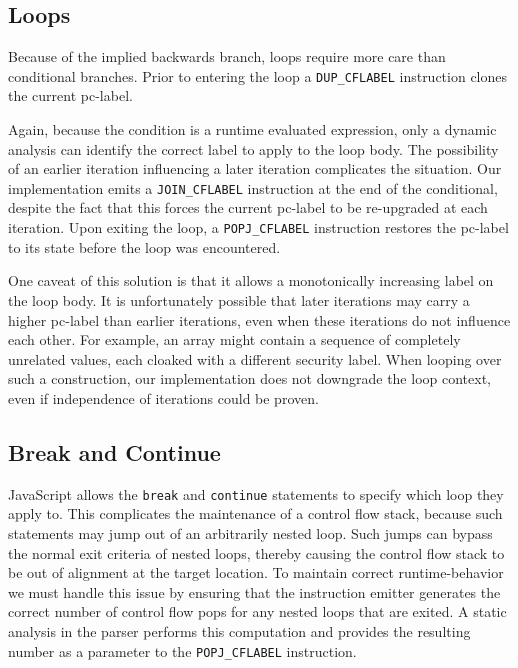 \subsection{Loops}

Because of the implied backwards branch, loops require more care than conditional branches.
Prior to entering the loop a \texttt{DUP\_CFLABEL} instruction clones the current pc-label.

Again, because the condition is a runtime evaluated expression, only a dynamic analysis can identify the correct label to apply to the loop body.
The possibility of an earlier iteration influencing a later iteration complicates the situation.
Our implementation emits a \texttt{JOIN\_CFLABEL} instruction at the end of the conditional, despite the fact that this forces the current pc-label to be re-upgraded at each iteration.
Upon exiting the loop, a \texttt{POPJ\_CFLABEL} instruction restores the pc-label to its state before the loop was encountered.

One caveat of this solution is that it allows a monotonically increasing label on the loop body.
It is unfortunately possible that later iterations may carry a higher pc-label than earlier iterations, even when these iterations do not influence each other.
For example, an array might contain a sequence of completely unrelated values, each cloaked with a different security label.
When looping over such a construction, our implementation does not downgrade the loop context, even if independence of iterations could be proven.

\subsection{Break and Continue}
\label{sec:break-and-continue}
JavaScript allows the \texttt{break} and \texttt{continue} statements to specify which loop they apply to.
This complicates the maintenance of a control flow stack, because such statements may jump out of an arbitrarily nested loop.
Such jumps can bypass the normal exit criteria of nested loops, thereby causing the control flow stack to be out of alignment at the target location.
To maintain correct runtime-behavior we must handle this issue by ensuring that the instruction emitter generates the correct number of control flow pops for any nested loops that are exited.
A static analysis in the parser performs this computation and provides the resulting number as a parameter to the \texttt{POPJ\_CFLABEL} instruction.

